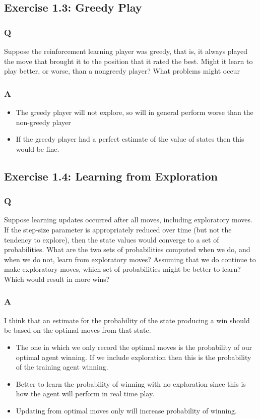 \subsection{Exercise 1.3: Greedy Play}
\subsubsection{Q}
Suppose the reinforcement learning player was greedy, that is, it always played the move that brought it to the position that it rated the best. Might it learn to play better, or worse, than a nongreedy player? What problems might occur

\subsubsection{A}
\begin{itemize}
    \item The greedy player will not explore, so will in general perform worse than the non-greedy player
    \item If the greedy player had a perfect estimate of the value of states then this would be fine.
\end{itemize}

\subsection{Exercise 1.4: Learning from Exploration}
\subsubsection{Q}
Suppose learning updates occurred after all moves, including exploratory moves. If the step-size parameter is appropriately reduced over time (but not the tendency to explore), then the state values would converge to a set of probabilities. What are the two sets of probabilities computed when we do, and when we do not, learn from exploratory moves? Assuming that we do continue to make exploratory moves, which set of probabilities might be better to learn? Which would result in more wins?
\subsubsection{A}
I think that an estimate for the probability of the state producing a win should be based on the optimal moves from that state.
\begin{itemize}
    \item The one in which we only record the optimal moves is the probability of our optimal agent winning. If we include exploration then this is the probability of the training agent winning.
    \item Better to learn the probability of winning with no exploration since this is how the agent will perform in real time play.
    \item Updating from optimal moves only will increase probability of winning.
\end{itemize}

